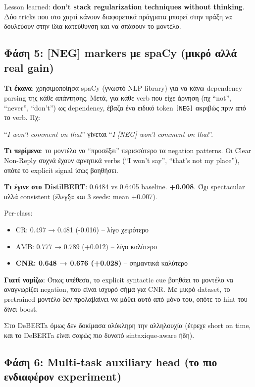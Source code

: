 \documentclass[12pt]{fphw}
\begin{document}
Lesson learned: \textbf{don't stack regularization techniques without thinking}. Δύο tricks που στο χαρτί κάνουν διαφορετικά πράγματα μπορεί στην πράξη να δουλεύουν στην ίδια κατεύθυνση και να σπάσουν το μοντέλο.

\subsection{Φάση 5: [NEG] markers με spaCy (μικρό αλλά real gain)}

\textbf{Τι έκανα}: χρησιμοποίησα spaCy (γνωστό NLP library) για να κάνω dependency parsing της κάθε απάντησης. Μετά, για κάθε verb που είχε άρνηση (πχ ``not'', ``never'', ``don't'') ως dependency, έβαζα ένα ειδικό token \texttt{[NEG]} ακριβώς πριν από το verb. Πχ:

``\emph{I won't comment on that}'' γίνεται ``\emph{I [NEG] won't comment on that}''.

\textbf{Τι περίμενα}: το μοντέλο να ``προσέξει'' περισσότερο τα negation patterns. Οι Clear Non-Reply συχνά έχουν αρνητικά verbs (``I won't say'', ``that's not my place''), οπότε το explicit signal ίσως βοηθήσει.

\textbf{Τι έγινε στο DistilBERT}: 0.6484 vs 0.6405 baseline. \textbf{+0.008}. Όχι spectacular αλλά consistent (έλεγξα και 3 seeds: mean +0.007).

Per-class:
\begin{itemize}
    \item CR: 0.497 → 0.481 (-0.016) -- λίγο χειρότερο
    \item AMB: 0.777 → 0.789 (+0.012) -- λίγο καλύτερο
    \item \textbf{CNR: 0.648 → 0.676 (+0.028)} -- σημαντικά καλύτερο
\end{itemize}

\textbf{Γιατί νομίζω}: Όπως υπέθεσα, το explicit syntactic cue βοηθάει το μοντέλο να αναγνωρίζει negation, που είναι ισχυρό σήμα για CNR. Με μικρό dataset, το pretrained μοντέλο δεν προλαβαίνει να μάθει αυτό από μόνο του, οπότε το hint του δίνει boost.

Στο DeBERTa όμως δεν δοκίμασα ολόκληρη την αλληλουχία (έτρεχε short on time, και το DeBERTa είναι σαφώς πιο δυνατό sintaxique-aware ήδη).

\subsection{Φάση 6: Multi-task auxiliary head (το πιο ενδιαφέρον experiment)}
\end{document}
